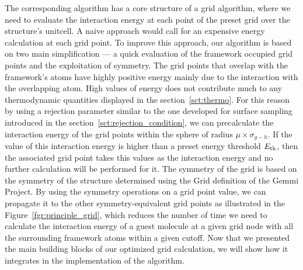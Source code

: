 \documentclass[main]{subfiles}
\begin{document}
The corresponding algorithm has a core structure of a grid algorithm, where we need to evaluate the interaction energy at each point of the preset grid over the structure's unitcell. A naive approach would call for an expensive energy calculation at each grid point. To improve this approach, our algorithm is based on two main simplification --- a quick evaluation of the framework occupied grid points and the exploitation of symmetry. The grid points that overlap with the framework's atoms have highly positive energy mainly due to the interaction with the overlapping atom. High values of energy does not contribute much to any thermodynamic quantities displayed in the section~\ref{sct:thermo}. For this reason by using a rejection parameter similar to the one developed for surface sampling introduced in the section~\ref{sct:rejection_condition}, we can precalculate the interaction energy of the grid points within the sphere of radius $\mu\times\sigma_{g-h}$. If the value of this interaction energy is higher than a preset energy threshold $E_{\text{th}}$, then the associated grid point takes this values as the interaction energy and no further calculation will be performed for it. The symmetry of the grid is based on the symmetry of the structure determined using the Grid definition of the Gemmi Project. By using the symmetry operations on a grid point value, we can propagate it to the other symmetry-equivalent grid points as illustrated in the Figure~\ref{fgr:principle_grid}, which reduces the number of time we need to calculate the interaction energy of a guest molecule at a given grid node with all the surrounding framework atoms within a given cutoff. Now that we presented the main building blocks of our optimized grid calculation, we will show how it integrates in the implementation of the algorithm.
\end{document}
